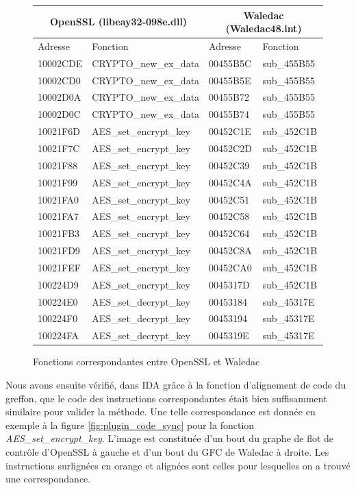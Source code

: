 \begin{figure}[h]
\begin{center}
\begin{tabular}{|l|l|l|l|}
\hline
\multicolumn{2}{|c|}{OpenSSL (libeay32-098e.dll)} & \multicolumn{2}{c|}{Waledac (Waledac48.int)} \\
\hline
Adresse & Fonction & Adresse & Fonction \\
\hline
 10002CDE & CRYPTO\_new\_ex\_data & 00455B5C & sub\_455B55 \\
 10002CD0 & CRYPTO\_new\_ex\_data & 00455B5E & sub\_455B55 \\
 10002D0A & CRYPTO\_new\_ex\_data & 00455B72 & sub\_455B55 \\
 10002D0C & CRYPTO\_new\_ex\_data & 00455B74 & sub\_455B55 \\
\hline
 10021F6D & AES\_set\_encrypt\_key & 00452C1E & sub\_452C1B \\
 10021F7C & AES\_set\_encrypt\_key & 00452C2D & sub\_452C1B \\
 10021F88 & AES\_set\_encrypt\_key & 00452C39 & sub\_452C1B \\
 10021F99 & AES\_set\_encrypt\_key & 00452C4A & sub\_452C1B \\
 10021FA0 & AES\_set\_encrypt\_key & 00452C51 & sub\_452C1B \\
 10021FA7 & AES\_set\_encrypt\_key & 00452C58 & sub\_452C1B \\
 10021FB3 & AES\_set\_encrypt\_key & 00452C64 & sub\_452C1B \\
 10021FD9 & AES\_set\_encrypt\_key & 00452C8A & sub\_452C1B \\
 10021FEF & AES\_set\_encrypt\_key & 00452CA0 & sub\_452C1B \\
 100224D9 & AES\_set\_encrypt\_key & 0045317D & sub\_452C1B \\
\hline
 100224E0 & AES\_set\_decrypt\_key & 00453184 & sub\_45317E \\
 100224F0 & AES\_set\_decrypt\_key & 00453194 & sub\_45317E \\
 100224FA & AES\_set\_decrypt\_key & 0045319E & sub\_45317E \\
\hline
\end{tabular}
\end{center}
\caption{Fonctions correspondantes entre OpenSSL et Waledac}
\label{fig:plugin_subroutines}
\end{figure}


Nous avons ensuite vérifié, dans IDA grâce à la fonction d'alignement de code du greffon, que le code des instructions correspondantes était bien suffisamment similaire pour valider la méthode.
Une telle correspondance est donnée en exemple à la figure \ref{fig:plugin_code_sync} pour la fonction \emph{AES\_set\_encrypt\_key}.
L'image est constituée d'un bout du graphe de flot de contrôle d'OpenSSL à gauche et d'un bout du GFC de Waledac à droite.
Les instructions surlignées en orange et alignées sont celles pour lesquelles on a trouvé une correspondance.

